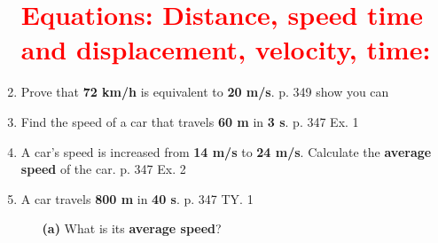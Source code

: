 \documentclass[A4,12pt]{article}
\begin{document}
\begin{enumerate}[label=\bfseries (\arabic*)]
\section*{\textcolor{red}{Equations: Distance, speed time and displacement, velocity, time:}}
%
%
%
%
%
%
%
%
%
\item Prove that \textbf{72 km/h} is equivalent to \textbf{20 m/s}. \cite{CCEADA} p. 349 show you can
%
%

%
%
%
%
%
%
%
%
%
%
%
%
%
%
%
%
%
%
%
%
%
%
%
%
\item Find the speed of a car that 
travels \textbf{60 m} in \textbf{3 s}. \cite{CCEADA} p. 347 Ex. 1
%
%

%
%
%
%
%
%
%
%
%
%
%
%
%
%
%
\item  A car's speed is increased from \textbf{14 m/s} to \textbf{24 m/s}. Calculate the \textbf{average speed} of the car. \cite{CCEADA} p. 347 Ex. 2
%
%

%
%
%
%
%
%
%
%
%
%
%
%
\item A car travels \textbf{800 m} in \textbf{40 s}. \cite{CCEADA} p. 347 TY. 1
\begin{itemize}
    \item[\bf (a)] What is its \textbf{average speed}?

\end{itemize}
\end{enumerate}
\end{document}
